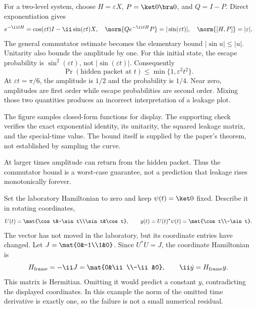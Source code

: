 For a two-level system, choose $H=\varepsilon X$, $P=\ket0\bra0$, and $Q=I-P$. Direct exponentiation gives
\[
e^{-\ii tH}=\cos(\varepsilon t)I-\ii\sin(\varepsilon t)X,
\quad
\norm{Qe^{-\ii tH}P}=|\sin(\varepsilon t)|,
\quad\norm{[H,P]}=|\varepsilon|.
\]
The general commutator estimate becomes the elementary bound $|\sin u|\le |u|$. Unitarity also bounds the amplitude by one.
For this initial state, the escape probability is $\sin^2(\varepsilon t)$, not $|\sin(\varepsilon t)|$. Consequently
\[
\Pr(\text{hidden packet at }t)\le\min\{1,\varepsilon^2t^2\}.
\]
At $\varepsilon t=\pi/6$, the amplitude is $1/2$ and the probability is $1/4$. Near zero, amplitudes are first order while escape probabilities are second order. Mixing those two quantities produces an incorrect interpretation of a leakage plot.

The figure samples closed-form functions for display. The supporting check verifies the exact exponential identity, its unitarity, the squared leakage matrix, and the special-time value. The bound itself is supplied by the paper's theorem, not established by sampling the curve.

At larger times amplitude can return from the hidden packet. Thus the commutator bound is a worst-case guarantee, not a prediction that leakage rises monotonically forever.

Set the laboratory Hamiltonian to zero and keep $\psi(t)=\ket0$ fixed. Describe it in rotating coordinates,
\[
U(t)=\mat{\cos t&-\sin t\\\sin t&\cos t},
\qquad y(t)=U(t)^*\psi(t)=\mat{\cos t\\-\sin t}.
\]
The vector has not moved in the laboratory, but its coordinate entries have changed.
Let $J=\mat{0&-1\\1&0}$. Since $U^*\dot U=J$, the coordinate Hamiltonian is
\[
H_{\rm frame}=-\ii J=\mat{0&\ii\\-\ii&0},
\qquad \ii\dot y=H_{\rm frame}y.
\]
This matrix is Hermitian. Omitting it would predict a constant $y$, contradicting the displayed coordinates. In this example the norm of the omitted time derivative is exactly one, so the failure is not a small numerical residual.

